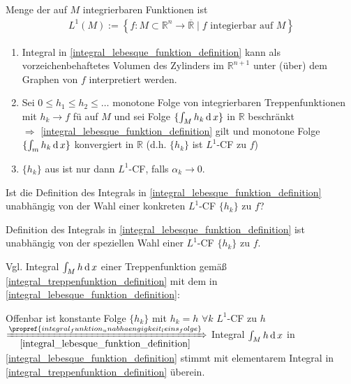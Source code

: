 \begin{*definition}
Menge der auf $M$ integrierbaren Funktionen ist  \begin{align*}
	L^1(M) := \left\{ f:M\subset\mathbb{R}^n\to\overline{\mathbb{R}} \mid f \text{ integierbar auf $M$} \right\}
\end{align*}
\end{*definition}

\begin{remark}\vspace*{0pt}
	\begin{enumerate}[label={\alph*)},topsep=\dimexpr -\baselineskip / 2\relax]
		\item Integral in \eqref{integral_lebesque_funktion_definition} kann als vorzeichenbehaftetes Volumen des Zylinders im $\mathbb{R}^{n+1}$ unter (über) dem Graphen von $f$ interpretiert werden.
		\item Sei $0\le h_1 \le h_2 \le \dotsc$ monotone Folge von integrierbaren Treppenfunktionen mit $h_k\to f$ \gls{fü} auf $M$ und sei Folge $\{ \int_M h_k\operatorname{d} x\}$ in $\mathbb{R}$ beschränkt \\
		$\Rightarrow$ \eqref{integral_lebesque_funktion_definition} gilt und monotone Folge $\{ \int_m h_k \operatorname{d} x \}$ konvergiert in $\mathbb{R}$ (d.h. $\{ h_k \}$ ist $L^1$-CF zu $f$)
		\item $\{ h_k\}$ aus  ist nur dann $L^1$-CF, falls $\alpha_k\to 0$.
	\end{enumerate}
\end{remark}

\begin{underlinedenvironment}[Frage]
	Ist die Definition des Integrals in \eqref{integral_lebesque_funktion_definition} unabhängig von der Wahl einer konkreten $L^1$-CF $\{ h_k\}$ zu $f$?
\end{underlinedenvironment}

\begin{proposition}
	Definition des Integrals in \eqref{integral_lebesque_funktion_definition} ist unabhängig von der speziellen Wahl einer $L^1$-CF $\{h_k\}$ zu $f$.
\end{proposition}

Vgl. Integral $\int_{M} h \operatorname{d} x$ einer Treppenfunktion gemäß \eqref{integral_treppenfunktion_definition} mit dem in \eqref{integral_lebesque_funktion_definition}:

Offenbar ist konstante Folge $\{ h_k\}$ mit $h_k = h$ $\forall k$ $L^1$-CF zu $h$ \\
$\xRightarrow[\eqref{integral_lebesque_funktion_definition}]{\propref{integral_funktion_unabhaengigkeit_leins_folge}}$ Integral $\int_M h \operatorname{d} x$ in \eqref{integral_lebesque_funktion_definition} stimmt mit elementarem Integral in \eqref{integral_treppenfunktion_definition} überein.


